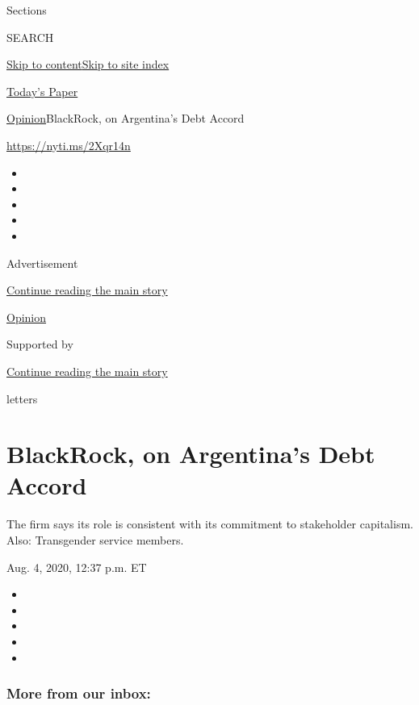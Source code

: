 Sections

SEARCH

\protect\hyperlink{site-content}{Skip to
content}\protect\hyperlink{site-index}{Skip to site index}

\href{https://myaccount.nytimes.com/auth/login?response_type=cookie\&client_id=vi}{}

\href{https://www.nytimes.com/section/todayspaper}{Today's Paper}

\href{/section/opinion}{Opinion}\textbar{}BlackRock, on Argentina's Debt
Accord

\url{https://nyti.ms/2Xqr14n}

\begin{itemize}
\item
\item
\item
\item
\item
\end{itemize}

Advertisement

\protect\hyperlink{after-top}{Continue reading the main story}

\href{/section/opinion}{Opinion}

Supported by

\protect\hyperlink{after-sponsor}{Continue reading the main story}

letters

\hypertarget{blackrock-on-argentinas-debt-accord}{%
\section{BlackRock, on Argentina's Debt
Accord}\label{blackrock-on-argentinas-debt-accord}}

The firm says its role is consistent with its commitment to stakeholder
capitalism. Also: Transgender service members.

Aug. 4, 2020, 12:37 p.m. ET

\begin{itemize}
\item
\item
\item
\item
\item
\end{itemize}

\hypertarget{more-from-our-inbox}{%
\subsubsection{More from our inbox:}\label{more-from-our-inbox}}

